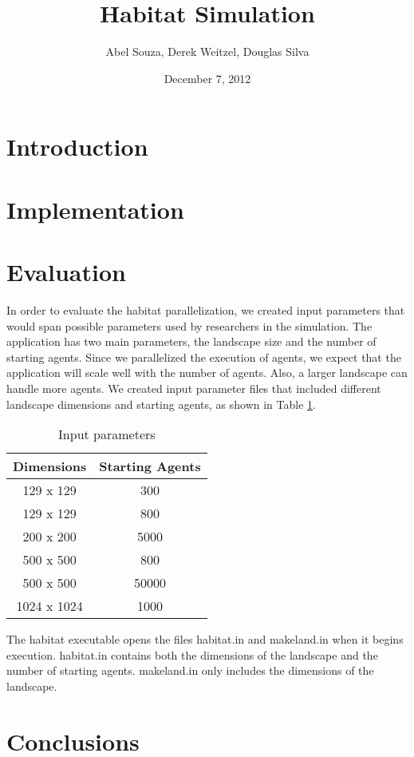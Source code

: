 \documentclass[12pt, notitlepage]{article}
\begin{document}
\title{Habitat Simulation}
\author{Abel Souza, Derek Weitzel, Douglas Silva}
\date{December 7, 2012}

\maketitle

\section{Introduction}

\section{Implementation}

\section{Evaluation}

In order to evaluate the habitat parallelization, we created input parameters that would span possible parameters used by researchers in the simulation.  The application has two main parameters, the landscape size and the number of starting agents.  Since we parallelized the execution of agents, we expect that the application will scale well with the number of agents.  Also, a larger landscape can handle more agents.  We created input parameter files that included different landscape dimensions and starting agents, as shown in Table \ref{tab:parameters}.

\begin{table}[ht]
\centering
\begin{tabular}{ c | c }
\textbf{Dimensions} & \textbf{Starting Agents} \\ 
\hline \hline
129 x 129 & 300 \\
129 x 129 & 800 \\
200 x 200 & 5000 \\
500 x 500 & 800 \\
500 x 500 & 50000 \\
1024 x 1024 & 1000
\end{tabular}
\caption{Input parameters} \label{tab:parameters}
\end{table}

The habitat executable opens the files habitat.in and makeland.in when it begins execution.  habitat.in contains both the dimensions of the landscape and the number of starting agents.  makeland.in only includes the dimensions of the landscape.  



\section{Conclusions}
\end{document}
